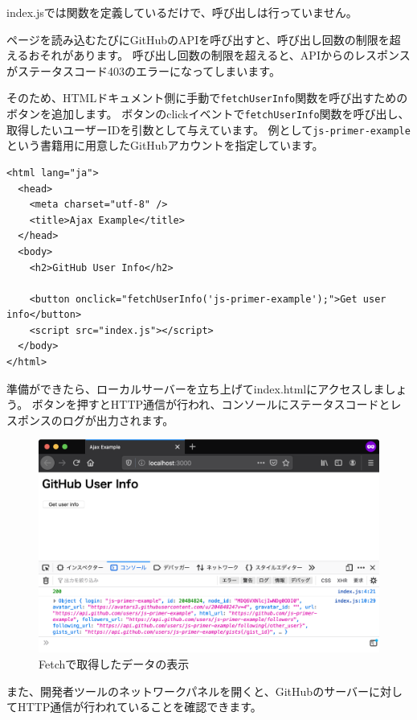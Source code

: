 index.jsでは関数を定義しているだけで、呼び出しは行っていません。

ページを読み込むたびにGitHubのAPIを呼び出すと、呼び出し回数の制限を超えるおそれがあります。
呼び出し回数の制限を超えると、APIからのレスポンスがステータスコード403のエラーになってしまいます。

そのため、HTMLドキュメント側に手動で\texttt{fetchUserInfo}関数を呼び出すためのボタンを追加します。
ボタンのclickイベントで\texttt{fetchUserInfo}関数を呼び出し、取得したいユーザーIDを引数として与えています。
例として\texttt{js-primer-example}という書籍用に用意したGitHubアカウントを指定しています。

\begin{lstlisting}
<html lang="ja">
  <head>
    <meta charset="utf-8" />
    <title>Ajax Example</title>
  </head>
  <body>
    <h2>GitHub User Info</h2>

    <button onclick="fetchUserInfo('js-primer-example');">Get user info</button>
    <script src="index.js"></script>
  </body>
</html>
\end{lstlisting}

準備ができたら、ローカルサーバーを立ち上げてindex.htmlにアクセスしましょう。
ボタンを押すとHTTP通信が行われ、コンソールにステータスコードとレスポンスのログが出力されます。

\begin{figure}[h]
\centering
\includegraphics[width=120mm]{fig/fig-2.png}
\caption{Fetchで取得したデータの表示}
\end{figure}

また、開発者ツールのネットワークパネルを開くと、GitHubのサーバーに対してHTTP通信が行われていることを確認できます。


